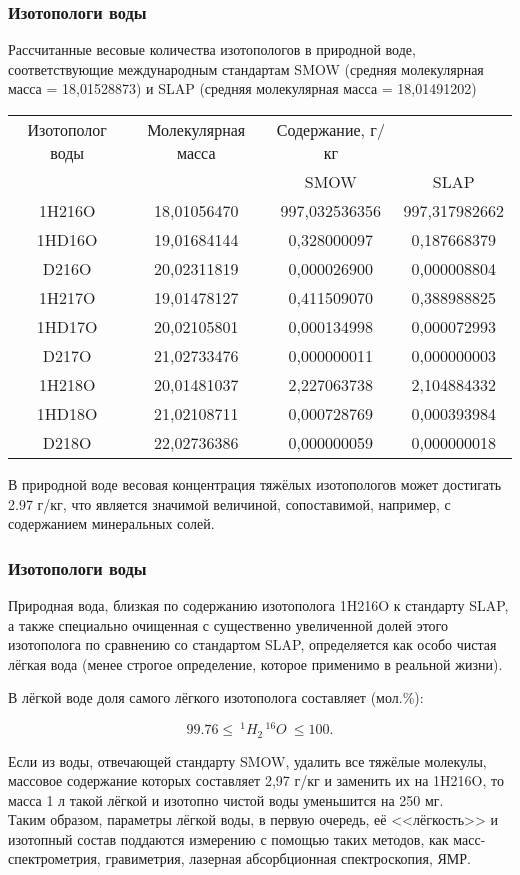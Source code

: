 \begin{frame}
\frametitle{Изотопологи воды}
Рассчитанные весовые количества изотопологов в природной воде, соответствующие международным стандартам SMOW (средняя молекулярная масса = 18,01528873) и SLAP (средняя молекулярная масса = 18,01491202) 
\begin{table}[h!]
	\begin{center}
		{\footnotesize
			\begin{tabular}{cccc}
				\hline
				Изотополог воды	& Молекулярная масса &	Содержание, г/кг & ~  \\
				~	& ~ &	SMOW & SLAP \\
				\hline
				1H216O &	18,01056470	& 997,032536356	& 997,317982662 \\
				1HD16O &	19,01684144	& 0,328000097&	0,187668379 \\
				D216O &	20,02311819	& 0,000026900	& 0,000008804\\
				1H217O	&19,01478127	& 0,411509070 &	0,388988825\\
				1HD17O &	20,02105801	& 0,000134998	& 0,000072993\\
				D217O &	21,02733476 &	0,000000011	& 0,000000003\\
				1H218O &	20,01481037	& 2,227063738	& 2,104884332\\
				1HD18O &	21,02108711	&0,000728769	&0,000393984\\
				D218O &	22,02736386	&0,000000059&	0,000000018	\\			
				\hline
			\end{tabular}
		}
	\end{center}
\end{table}
В природной воде весовая концентрация тяжёлых изотопологов может достигать 2.97 г/кг, что является значимой величиной, сопоставимой, например, с содержанием минеральных солей.

\end{frame}


\begin{frame}
\frametitle{Изотопологи воды}
Природная вода, близкая по содержанию изотополога 1H216O к стандарту SLAP, а также специально очищенная с существенно увеличенной долей этого изотополога по сравнению со стандартом SLAP, определяется как особо чистая лёгкая вода (менее строгое определение, которое применимо в реальной жизни).

В лёгкой воде доля самого лёгкого изотополога составляет (мол.\%):

\begin{equation*}
99.76 \leq \ ^1H_2\,^{16}O \ \leq 100.
\end{equation*}

Если из воды, отвечающей стандарту SMOW, удалить все тяжёлые молекулы, массовое содержание которых составляет 2,97 г/кг и заменить их на 1H216O, то масса 1 л такой лёгкой и изотопно чистой воды уменьшится на 250 мг. \\
Таким образом, параметры лёгкой воды, в первую очередь, её <<лёгкость>> и изотопный состав поддаются измерению с помощью таких методов, как масс-спектрометрия, гравиметрия, лазерная абсорбционная спектроскопия, ЯМР.

\end{frame}


